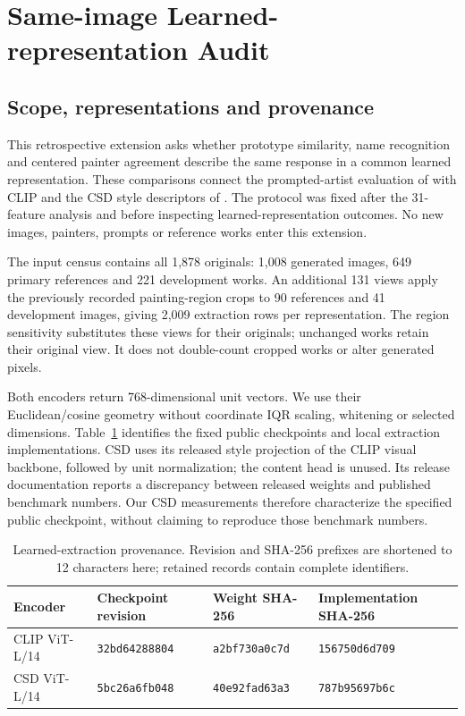 \section{Same-image Learned-representation Audit}\label{app:learned-audit}

\subsection{Scope, representations and provenance}
This retrospective extension asks whether prototype similarity, name recognition
and centered painter agreement describe the same response in a common learned
representation. These comparisons connect the prompted-artist evaluation of
\citet{su2025prompted} with CLIP \citep{radford2021} and the CSD style descriptors
of \citet{somepalli2024style}. The protocol was fixed after the 31-feature analysis
and before inspecting learned-representation outcomes. No new images, painters,
prompts or reference works enter this extension.

The input census contains all 1,878 originals: 1,008 generated images, 649 primary
references and 221 development works. An additional 131 views apply the previously
recorded painting-region crops to 90 references and 41 development images, giving
2,009 extraction rows per representation. The region sensitivity substitutes these
views for their originals; unchanged works retain their original view. It does not
double-count cropped works or alter generated pixels.

Both encoders return 768-dimensional unit vectors. We use their Euclidean/cosine
geometry without coordinate IQR scaling, whitening or selected dimensions.
Table~\ref{tab:learned-provenance} identifies the fixed public checkpoints and
local extraction implementations. CSD uses its released style projection of the
CLIP visual backbone, followed by unit normalization; the content head is unused.
Its release documentation reports a discrepancy between released weights and
published benchmark numbers. Our CSD measurements therefore characterize the
specified public checkpoint, without claiming to reproduce those benchmark numbers.

\begin{table}[htbp]
\caption{Learned-extraction provenance. Revision and SHA-256 prefixes are shortened
to 12 characters here; retained records contain complete identifiers.}
\label{tab:learned-provenance}
\centering\small\setlength{\tabcolsep}{6pt}
\begin{tabularx}{\linewidth}{@{}lXXX@{}}
\toprule
Encoder & Checkpoint revision & Weight SHA-256 & Implementation SHA-256\\
\midrule
CLIP ViT-L/14 & \texttt{32bd64288804} & \texttt{a2bf730a0c7d} & \texttt{156750d6d709}\\
CSD ViT-L/14 & \texttt{5bc26a6fb048} & \texttt{40e92fad63a3} & \texttt{787b95697b6c}\\
\bottomrule
\end{tabularx}
\end{table}

